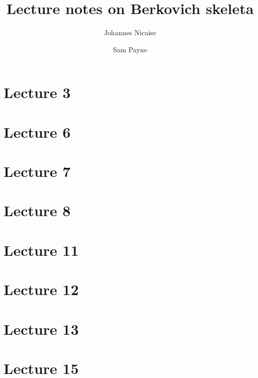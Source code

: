 \documentclass[10pt,a4paper]{article}
\title{Lecture notes on Berkovich skeleta}
\author{Johannes Nicaise \and Sam Payne}
\numberwithin{equation}{section}
\begin{document}
\maketitle




\section{Lecture 3}




\section{Lecture 6}
\section{Lecture 7}
\section{Lecture 8}


\section{Lecture 11}
\section{Lecture 12}
\section{Lecture 13}

\section{Lecture 15}
\end{document}
